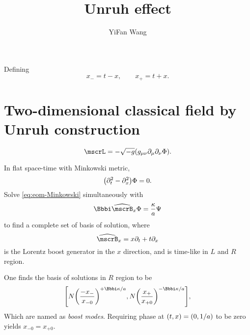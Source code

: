 \documentclass[a4paper]{article}
\title{Unruh effect}
\author{YiFan Wang}
\begin{document}
\maketitle


\tableofcontents

Defining
\begin{equation}
x_- = t-x,\qquad x_+ = t+x.
\end{equation}

\section{Two-dimensional classical field by Unruh construction}

\begin{equation}
\Ld = -\sqrt{-g}\rbr{g_{\mu\nu}\partial_\mu \partial_\nu \Phi}.
\end{equation}

In flat space-time with Minkowski metric,
\begin{equation}
{\left(\partial_t^2 - \partial_x^2\right)}\Phi = 0.
\label{eq:eom-Minkowski}
\end{equation}
Solve \cref{eq:eom-Minkowski} simultaneously with 
\begin{equation}
\ii\what{\mscrB}_x \Phi = \frac{\kappa}{a}\Psi
\end{equation}
to find a complete set of basis of solution, where
\begin{equation}
\what{\mscrB}_x = x\partial_t + t \partial_x
\end{equation}
is the Lorentz boost generator in the $x$ direction, and is time-like in $L$ 
and $R$ region. 

One finds the basis of solutions in $R$ region to be
\begin{equation}
\sbr{N\rbr{\frac{-x_-}{x_{-0}}}^{+\ii\kappa/a}, 
N\rbr{\frac{x_+}{x_{+0}}}^{-\ii\kappa/a}},
\end{equation}
Which are named as \emph{boost modes}. Requiring phase at ${\left(t, x\right)} = {\left(0, 
1/a\right)}$ to be zero yields $x_{-0} = x_{+0}$.






\end{document}
